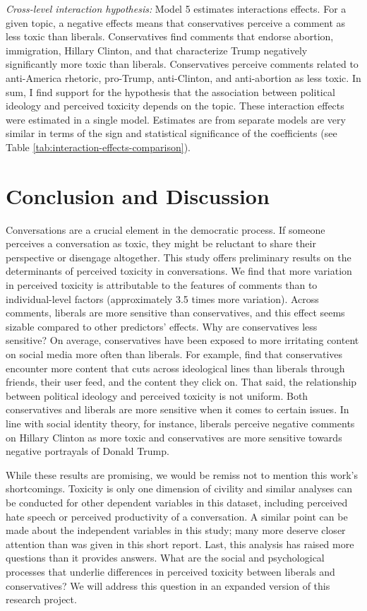 \documentclass{article}
\begin{document}
\textit{Cross-level interaction hypothesis:} Model 5 estimates interactions effects. For a given topic, a negative effects means that conservatives perceive a comment as less toxic than liberals. Conservatives find comments that endorse abortion, immigration, Hillary Clinton, and that characterize Trump negatively significantly more toxic than liberals. Conservatives perceive comments related to anti-America rhetoric, pro-Trump, anti-Clinton, and anti-abortion as less toxic. In sum, I find support for the hypothesis that the association between political ideology and perceived toxicity depends on the topic. These interaction effects were estimated in a single model. Estimates are from separate models are very similar in terms of the sign and statistical significance of the coefficients (see Table \ref{tab:interaction-effects-comparison}).

\section{Conclusion and Discussion}

Conversations are a crucial element in the democratic process. If someone perceives a conversation as toxic, they might be reluctant to share their perspective or disengage altogether. This study offers preliminary results on the determinants of perceived toxicity in conversations. We find that more variation in perceived toxicity is attributable to the features of comments than to individual-level factors (approximately 3.5 times more variation). Across comments, liberals are more sensitive than conservatives, and this effect seems sizable compared to other predictors' effects. Why are conservatives less sensitive? On average, conservatives have been exposed to more irritating content on social media more often than liberals. For example, \citet{bakshy_exposure_2015} find that conservatives encounter more content that cuts across ideological lines than liberals through friends, their user feed, and the content they click on. That said, the relationship between political ideology and perceived toxicity is not uniform. Both conservatives and liberals are more sensitive when it comes to certain issues. In line with social identity theory, for instance, liberals perceive negative comments on Hillary Clinton as more toxic and conservatives are more sensitive towards negative portrayals of Donald Trump. 

While these results are promising, we would be remiss not to mention this work's shortcomings. Toxicity is only one dimension of civility and similar analyses can be conducted for other dependent variables in this dataset, including perceived hate speech or perceived productivity of a conversation. A similar point can be made about the independent variables in this study; many more deserve closer attention than was given in this short report. Last, this analysis has raised more questions than it provides answers. What are the social and psychological processes that underlie differences in perceived toxicity between liberals and conservatives? We will address this question in an expanded version of this research project. 
\end{document}
